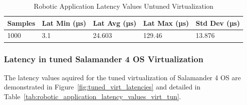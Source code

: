 \documentclass[MMR,Master,english]{twbook}
\begin{document}
\begin{table}[H]
	\centering
	\caption{Robotic Application Latency Values Untuned Virtualization}
	\label{tab:robotic_application_latency_values_virt_def}
	\setlength{\tabcolsep}{0.5em} %
	{\renewcommand{\arraystretch}{1.2}%
		\begin{tabular}{|l|l|l|l|l|}
			\hline
			\textbf{Samples} & \textbf{Lat Min (µs)} & \textbf{Lat Avg (µs)} & \textbf{Lat Max (µs)} & \textbf{Std Dev (µs)} \\ \hline
			1000             & 3.1                 & 24.603                  & 129.46            & 13.876                  \\ \hline
		\end{tabular}}
\end{table}

\clearpage

\subsubsection{Latency in tuned Salamander 4 OS Virtualization}\label{subsubsec:latency_virtualization}
\noindent The latency values aquired for the tuned virtualization of Salamander 4 OS are demonstrated in Figure~\ref{fig:tuned_virt_latencies} and detailed in Table~\ref{tab:robotic_application_latency_values_virt_tun}. 
\end{document}
